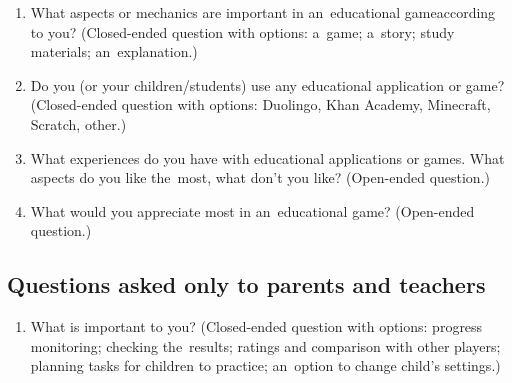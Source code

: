 \begin{enumerate}
    \item What aspects or mechanics are important in an~educational game\linebreak{}according to you? (Closed-ended question with options: a~game; a~story; study materials; an~explanation.)
    \item Do you (or your children/students) use any educational application or game? (Closed-ended question with options: Duolingo, Khan Academy, Minecraft, Scratch, other.)
    \item What experiences do you have with educational applications or games. What aspects do you like the~most, what don't you like? (Open-ended question.)
    \item What would you appreciate most in an~educational game? (Open-ended question.) 
\end{enumerate}

\subsection*{Questions asked only to parents and teachers}

\begin{enumerate}
    \item What is important to you? (Closed-ended question with options: pro\-gress monitoring; checking the~results; ratings and comparison with other players; planning tasks for children to practice; an~option to change child's settings.) 
\end{enumerate}
